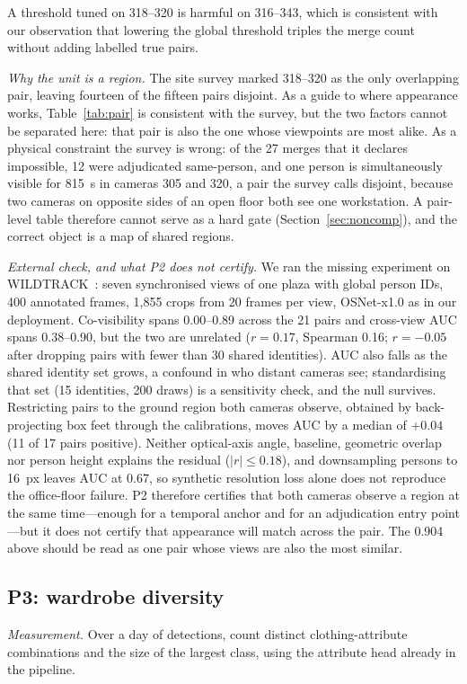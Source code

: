 \documentclass[journal]{IEEEtran}
\begin{document}
A threshold tuned on 318--320 is harmful on 316--343, which is consistent with our observation that lowering the global threshold triples the merge count without adding labelled true pairs.

\emph{Why the unit is a region.} The site survey marked 318--320 as the only overlapping pair, leaving fourteen of the fifteen pairs disjoint. As a guide to where appearance works, Table~\ref{tab:pair} is consistent with the survey, but the two factors cannot be separated here: that pair is also the one whose viewpoints are most alike. As a physical constraint the survey is wrong: of the 27 merges that it declares impossible, 12 were adjudicated same-person, and one person is simultaneously visible for 815~s in cameras 305 and 320, a pair the survey calls disjoint, because two cameras on opposite sides of an open floor both see one workstation. A pair-level table therefore cannot serve as a hard gate (Section~\ref{sec:noncomp}), and the correct object is a map of shared regions.

\emph{External check, and what P2 does not certify.} We ran the missing experiment on WILDTRACK~\cite{chavdarova2018}: seven synchronised views of one plaza with global person IDs, 400 annotated frames, 1{,}855 crops from 20 frames per view, OSNet-x1.0 as in our deployment. Co-visibility spans 0.00--0.89 across the 21 pairs and cross-view AUC spans 0.38--0.90, but the two are unrelated ($r=0.17$, Spearman 0.16; $r=-0.05$ after dropping pairs with fewer than 30 shared identities). AUC also falls as the shared identity set grows, a confound in who distant cameras see; standardising that set (15 identities, 200 draws) is a sensitivity check, and the null survives. Restricting pairs to the ground region both cameras observe, obtained by back-projecting box feet through the calibrations, moves AUC by a median of $+0.04$ (11 of 17 pairs positive). Neither optical-axis angle, baseline, geometric overlap nor person height explains the residual ($|r|\le0.18$), and downsampling persons to 16~px leaves AUC at 0.67, so synthetic resolution loss alone does not reproduce the office-floor failure. P2 therefore certifies that both cameras observe a region at the same time---enough for a temporal anchor and for an adjudication entry point---but it does not certify that appearance will match across the pair. The 0.904 above should be read as one pair whose views are also the most similar.

\subsection{P3: wardrobe diversity}
\emph{Measurement.} Over a day of detections, count distinct clothing-attribute combinations and the size of the largest class, using the attribute head already in the pipeline.
\end{document}
